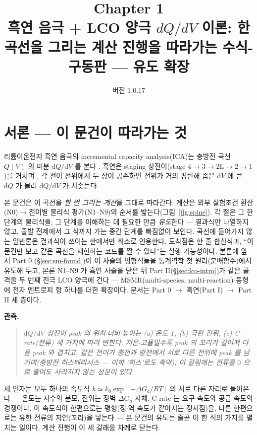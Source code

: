\documentclass[11pt,a4paper]{article}
\title{\textbf{\LARGE Chapter 1}\\[0.35em]\Large 흑연 음극 + LCO 양극 $dQ/dV$ 이론: 한 곡선을 그리는 계산 진행을 따라가는 수식-구동판 — 유도 확장}
\author{}
\date{\normalsize 버전 1.0.17}
\newcommand{\dd}{\mathrm{d}}
\begin{document}
\maketitle

\section*{서론 — 이 문건이 따라가는 것}
리튬이온전지 흑연 음극의 incremental capacity analysis(ICA)는 충방전 곡선 $Q(V)$ 의 미분
$\dd Q/\dd V$ 를 본다 \cite{bloom2005,dubarry2012}. 흑연은 staging 상전이(stage
$4\!\to\!3\!\to\!2\mathrm L\!\to\!2\!\to\!1$)를 거치며 \cite{dahn1991,ohzuku1993}, 각 전이 전위에서
두 상이 공존하면 전위가 거의 평탄해 좁은 $\dd V$ 에 큰 $\dd Q$ 가 몰려 $\dd Q/\dd V$ 가 치솟는다.

본 문건은 이 곡선을 \emph{한 번 그리는 계산}을 그대로 따라간다. 계산은 외부 실험조건 환산(N0)$\to$전이별
물리식 평가(N1--N9)의 순서를 밟는다(그림~\ref{fig:spine}). 각 절은 그 한 단계의 물리식을, 그 단계를 이해하는 데 필요한 만큼
\emph{유도}한다 — 결과식만 나열하지 않고, 출발 전제에서 그 식까지 가는 중간 단계를 빠짐없이 보인다. 곡선에 들어가지 않는 일반론은 결과식이 쓰이는 한에서만 최소로 인용한다. 도착점은 한 줄
합산식과, ``이 문건만 보고 같은 곡선을 재현하는 코드를 짤 수 있다''는 실행 가능성이다. 본론에 앞서 Part 0
(\S\ref{sec:sm-found})이 이 사슬의 평형식들을 통계역학 첫 원리(분배함수)에서 유도해 두고, 본론 N1--N9 가 흑연
사슬을 닫은 뒤 Part II(\S\ref{sec:lco-intro})가 같은 골격을 두 번째 전극 LCO 양극에 건다 — MSMR(multi-species,
multi-reaction) 동형에 전자 엔트로피 항 하나를 더한 확장이다. 문서는 Part 0 $\to$ 흑연(Part I) $\to$ Part II 세 층이다.

\textbf{관측.}
\begin{quote}\itshape
$\dd Q/\dd V$ 상전이 peak 의 위치$\cdot$너비$\cdot$높이는 (a) 온도 $T$, (b) 극판 전위, (c) C-rate(전류)
세 가지에 따라 변한다. 저온$\cdot$고율일수록 peak 의 꼬리가 길어져 다음 peak 와 겹치고, 같은 전이가 충전과 방전에서
서로 다른 전위에 peak 를 남기며(충방전 히스테리시스 — 이하 `히스'로도 축약), 이 갈림에는 전류를 $0$ 으로 줄여도 사라지지 않는 성분이 있다.
\end{quote}

세 인자는 모두 하나의 속도식 $k\simeq k_0\exp[-\Delta G_a/RT]$ 의 서로 다른 자리로 들어온다 — 온도는 지수의 분모,
전위는 장벽 $\Delta G_a$ 자체, C-rate 는 요구 속도와 공급 속도의 경쟁이다. 이 속도식이 한편으로는 평형(정$\cdot$역
속도가 같아지는 정지점)을, 다른 한편으로는 유한 전류의 지연(꼬리)을 낳는다 — 본 문건의 유도는 줄곧 이 한 식의 가지를
펼치는 일이다. 계산 진행이 이 세 갈래를 차례로 닫는다.
\end{document}
